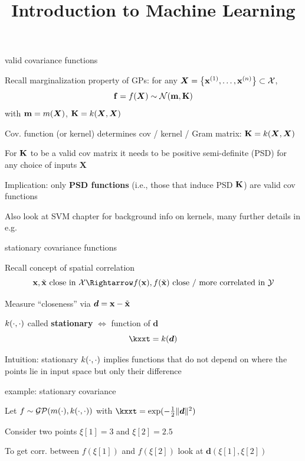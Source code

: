\documentclass[11pt,compress,t,notes=noshow, xcolor=table]{beamer}
\title{Introduction to Machine Learning}
\begin{document}

\begin{framei}[sep=L]{valid covariance functions}
\item Recall marginalization property of GPs: for any $\bm{X} = \left\{ \mathbf{x}^{(1)}, \ldots, \mathbf{x}^{(n)}\right\} \subset \mathcal{X}$,
$$\mathbf{f} = f(\bm{X}) \sim \mathcal{N}(\mathbf{m}, \mathbf{K})$$
with $\mathbf{m} = m(\bm{X})$, $\mathbf{K} = k(\bm{X}, \bm{X})$
\item Cov. function (or kernel) determines cov / kernel / Gram matrix: $\mathbf{K} = k(\bm{X}, \bm{X})$
\item For $\mathbf{K}$ to be a valid cov matrix it needs to be positive semi-definite (PSD) for any choice of inputs $\bm{X}$
\item Implication: only \textbf{PSD functions} (i.e., those that induce PSD $\mathbf{K}$) are valid cov functions 

\item Also look at SVM chapter for background info on kernels, 
many further details in e.g. 

\end{framei}

\begin{framei}[sep=L]{stationary covariance functions}
\item Recall concept of spatial correlation
$$\xv, \xtil \text{ close in } \Xspace \Rightarrow \fx, f(\xtil) \text{ close / more correlated in } \Yspace$$
\item Measure ``closeness'' via $\bm{d} = \mathbf{x} - \tilde{\mathbf{x}}$ 
\item $k(\cdot, \cdot)$ called \textbf{stationary} $\Leftrightarrow$ function of $\bm{d}$ 
$$\kxxt = k(\bm{d})$$
\item Intuition: stationary $k(\cdot, \cdot)$ implies functions that do not depend on where the points lie in input space but only their difference 

\end{framei}

\begin{framei}{example: stationary covariance} 
\item Let $f \sim \mathcal{GP}(m(\cdot), k(\cdot, \cdot))$ with $\kxxt = \exp(-\tfrac{1}{2}\|\bm{d}\|^2)$ 
\item Consider two points $\xi[1] = 3$ and $\xi[2] = 2.5$ 
\item To get corr. between $f(\xi[1])$ and $f(\xi[2])$ look at $\bm{d}(\xi[1], \xi[2])$ 
\vfill 
{} 
\end{framei} 
\end{document}
